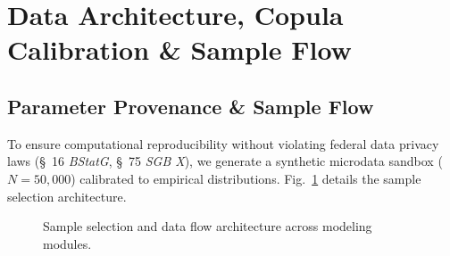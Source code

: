 \documentclass[conference]{IEEEtran}
\begin{document}
\section{Data Architecture, Copula Calibration \& Sample Flow}

\subsection{Parameter Provenance & Sample Flow}
To ensure computational reproducibility without violating federal data privacy laws (\S~16 \textit{BStatG}, \S~75 \textit{SGB X}), we generate a synthetic microdata sandbox ($N = 50,000$) calibrated to empirical distributions. Fig.~\ref{fig:sample_flow} details the sample selection architecture.

\begin{figure}[htbp]
\centering
{}
\caption{Sample selection and data flow architecture across modeling modules.}
\label{fig:sample_flow}
\end{figure}
\end{document}
